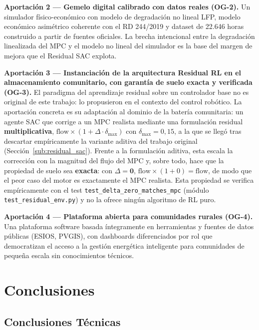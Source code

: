 \documentclass[12pt, a4paper, twoside]{report}
\begin{document}
\textbf{Aportación 2 — Gemelo digital calibrado con datos reales (OG-2).}
Un simulador físico-económico con modelo de degradación no lineal LFP,
modelo económico asimétrico coherente con el RD 244/2019 y dataset de
22.646 horas construido a partir de fuentes oficiales. La brecha intencional
entre la degradación linealizada del MPC y el modelo no lineal del simulador
es la base del margen de mejora que el Residual SAC explota.

\textbf{Aportación 3 — Instanciación de la arquitectura Residual RL en el
almacenamiento comunitario, con garantía de suelo exacta y verificada (OG-3).}
El paradigma del aprendizaje residual sobre un controlador base no es original
de este trabajo: lo propusieron \citet{Johannink2019} en el contexto del control
robótico. La aportación concreta es su adaptación al dominio de la batería
comunitaria: un agente SAC que corrige a un MPC realista mediante una
formulación residual \textbf{multiplicativa},
$\text{flow}\times(1+\Delta\cdot\delta_{\max})$ con $\delta_{\max}=0{,}15$, a la
que se llegó tras descartar empíricamente la variante aditiva del trabajo
original (Sección~\ref{sub:residual_sac}). Frente a la formulación aditiva, esta
escala la corrección con la magnitud del flujo del MPC y, sobre todo, hace que
la propiedad de suelo sea \textbf{exacta}: con $\Delta = \mathbf{0}$,
$\text{flow}\times(1+0)=\text{flow}$, de modo que el peor caso del motor es
exactamente el MPC realista. Esta propiedad se verifica empíricamente con el
test \texttt{test\_delta\_zero\_matches\_mpc} (módulo
\texttt{test\_residual\_env.py}) y no la ofrece ningún algoritmo de RL puro.

\textbf{Aportación 4 — Plataforma abierta para comunidades rurales (OG-4).}
Una plataforma software basada íntegramente en herramientas y fuentes de datos
públicas (ESIOS, PVGIS), con dashboards diferenciados por rol que
democratizan el acceso a la gestión energética inteligente para comunidades de
pequeña escala sin conocimientos técnicos.

\chapter{Conclusiones}
\label{chap:conclusiones}

\section{Conclusiones Técnicas}
\end{document}
